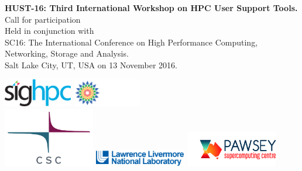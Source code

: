 \documentclass[11pt,a4paper]{article}
\begin{document}
\begin{titlepage}
\begin{center}
\vspace{35mm}
{\bf {\selectfont \fontsize{30}{35}\selectfont HUST-16:  Third International Workshop on HPC User Support Tools.}}\\
\vspace{20mm}
{ {\selectfont \Huge Call for participation}}\\
\vspace{10mm}
{ {\selectfont \Huge Held in conjunction with }}\\
{ {\selectfont \Huge SC16: The International Conference on High
Performance Computing, Networking, Storage and Analysis.}}\\
\vspace{40mm}
{ {\selectfont \Huge Salt Lake City, UT, USA on 13 November 2016. }}\\
\vspace{25mm}

\includegraphics[width=30mm]{../img/sighpc-logo.png}
\hspace{10mm}
\includegraphics[width=30mm]{../img/sc16logo.png}
\\
\includegraphics[width=40mm]{../img/CSC_2012_LOGO_RGB.pdf}
\hspace{10mm}
\includegraphics[width=40mm]{../img/lab_logo_blue.png}
\hspace{10mm}
\includegraphics[width=40mm]{../img/PawseyLogoHorizontal.jpg}

\end{center}
\end{titlepage}
\end{document}
